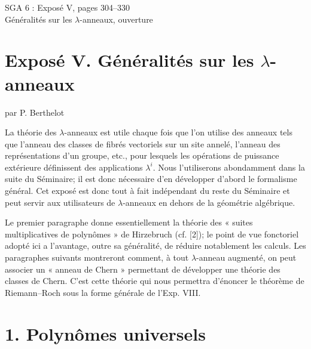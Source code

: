 \documentclass[11pt]{article}
\newcommand{\Fil}{\operatorname{Fil}}
\begin{document}
\providecommand{\Chat}{\widehat C}
\providecommand{\Ghat}{\widehat G}
\providecommand{\Gg}{\widehat G_g}
\providecommand{\Ga}{\widehat G_a}
\providecommand{\Grhat}{\widehat{\operatorname{Gr}}}
\providecommand{\Abfil}{\mathrm{Ab\,fil}}
\providecommand{\Kalgfil}{K\text{-}\mathrm{Alg.fil.}}
\providecommand{\Hom}{\operatorname{Hom}}
\providecommand{\Sym}{\mathfrak S}
\providecommand{\id}{\operatorname{Id}}
\providecommand{\Log}{\operatorname{Log}}
\providecommand{\Toddc}{\operatorname{Todd}}
\providecommand{\Ob}{\operatorname{Ob}}
\providecommand{\cG}{\mathcal G}
\providecommand{\cCzero}{\mathcal C_0}
\providecommand{\Fil}{\operatorname{Fil}}


\begin{center}
{\Large SGA 6 : Exposé V, pages 304--330}\\[0.4em]
{\large Généralités sur les \(\lambda\)-anneaux, ouverture}
\end{center}


\section*{Exposé V. Généralités sur les \(\lambda\)-anneaux}
\begin{center}
par P. Berthelot
\end{center}

La théorie des \(\lambda\)-anneaux est utile chaque fois que l'on utilise des anneaux tels que l'anneau des classes de fibrés vectoriels sur un site annelé, l'anneau des représentations d'un groupe, etc., pour lesquels les opérations de puissance extérieure définissent des applications \(\lambda^i\). Nous l'utiliserons abondamment dans la suite du Séminaire; il est donc nécessaire d'en développer d'abord le formalisme général. Cet exposé est donc tout à fait indépendant du reste du Séminaire et peut servir aux utilisateurs de \(\lambda\)-anneaux en dehors de la géométrie algébrique.

Le premier paragraphe donne essentiellement la théorie des « suites multiplicatives de polynômes » de Hirzebruch (cf. [2]); le point de vue fonctoriel adopté ici a l'avantage, outre sa généralité, de réduire notablement les calculs. Les paragraphes suivants montreront comment, à tout \(\lambda\)-anneau augmenté, on peut associer un « anneau de Chern » permettant de développer une théorie des classes de Chern. C'est cette théorie qui nous permettra d'énoncer le théorème de Riemann--Roch sous la forme générale de l'Exp. VIII.

\section*{1. Polynômes universels}
\end{document}

